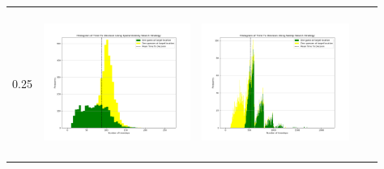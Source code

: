 \begin{landscape}
\begin{table}[h!]
\begin{tabular}{ | c | c | c | c | c |}
    0.25 &
    \begin{minipage}[c][48mm][c]{48mm}
      \includegraphics[width=48mm, height=48mm]{Chapters/MultiAgentTargetDetection/Figs/Histograms/VaryingInitBelief/25/25EpsilonGreedyHistogram.png}
    \end{minipage}
    &
    \begin{minipage}[c][48mm][c]{48mm}
      \includegraphics[width=48mm, height=48mm]{Chapters/MultiAgentTargetDetection/Figs/Histograms/VaryingInitBelief/25/25SweepHistogram.png}


\end{minipage}
\end{tabular}
\end{table}
\end{landscape}

